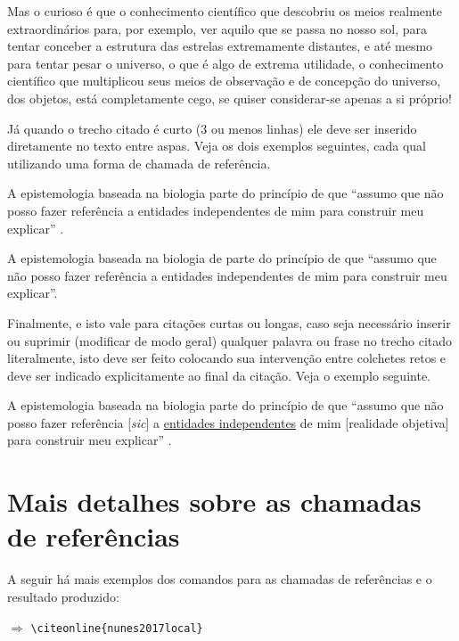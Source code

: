 \begin{apendicesenv}
    \begin{citacao}
        Mas o curioso é que o conhecimento científico que descobriu os meios realmente extraordinários para, por exemplo, ver aquilo que se passa no nosso sol, para tentar conceber a estrutura das estrelas extremamente distantes, e até mesmo para tentar pesar o universo, o que é algo de extrema utilidade, o conhecimento científico que multiplicou seus meios de observação e de concepção do universo, dos objetos, está completamente cego, se quiser considerar-se apenas a si próprio!
    \end{citacao}

    Já quando o trecho citado é curto (3 ou menos linhas) ele deve ser inserido diretamente no texto entre aspas.
    Veja os dois exemplos seguintes, cada qual utilizando uma forma de chamada de referência.

    A epistemologia baseada na biologia parte do princípio de que ``assumo que não posso fazer referência a entidades independentes de mim para construir meu explicar'' \cite[p.~35]{Maturana2003}.

    A epistemologia baseada na biologia de  parte do princípio de que ``assumo que não posso fazer referência a entidades independentes de mim para construir meu explicar''.

    Finalmente, e isto vale para citações curtas ou longas, caso seja necessário inserir ou suprimir (modificar de modo geral) qualquer palavra ou frase no trecho citado literalmente, isto deve ser feito colocando sua intervenção entre colchetes retos e deve ser indicado explicitamente ao final da citação.
    Veja o exemplo seguinte.

    A epistemologia baseada na biologia parte do princípio de que ``assumo que não posso fazer referência [\textit{sic}] a \underline{entidades independentes} de mim [realidade objetiva] para construir meu explicar'' \cite[p.~35, comentários e grifo nosso]{Maturana2003}.

    \section{Mais detalhes sobre as chamadas de referências}
    \label{sec_chamadas_referencias}

    A seguir há mais exemplos dos comandos para as chamadas de referências e o resultado produzido:

     $\Longrightarrow$ \verb|\citeonline{nunes2017local}|


\end{apendicesenv}
